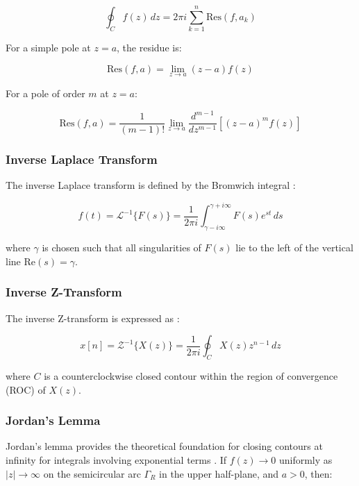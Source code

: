 \documentclass[conference]{IEEEtran}
\begin{document}
\begin{equation}
\oint_C f(z) \, dz = 2\pi i \sum_{k=1}^{n} \text{Res}(f, a_k)
\end{equation}

For a simple pole at $z = a$, the residue is:

\begin{equation}
\text{Res}(f, a) = \lim_{z \to a} (z-a)f(z)
\end{equation}

For a pole of order $m$ at $z = a$:

\begin{equation}
\text{Res}(f, a) = \frac{1}{(m-1)!} \lim_{z \to a} \frac{d^{m-1}}{dz^{m-1}}[(z-a)^m f(z)]
\end{equation}

\subsubsection{Inverse Laplace Transform}

The inverse Laplace transform is defined by the Bromwich integral \cite{doetsch1974}:

\begin{equation}
f(t) = \mathcal{L}^{-1}\{F(s)\} = \frac{1}{2\pi i} \int_{\gamma-i\infty}^{\gamma+i\infty} F(s)e^{st} \, ds
\end{equation}

where $\gamma$ is chosen such that all singularities of $F(s)$ lie to the left of the vertical line $\text{Re}(s) = \gamma$.

\subsubsection{Inverse Z-Transform}

The inverse Z-transform is expressed as \cite{proakis2007}:

\begin{equation}
x[n] = \mathcal{Z}^{-1}\{X(z)\} = \frac{1}{2\pi i} \oint_C X(z)z^{n-1} \, dz
\end{equation}

where $C$ is a counterclockwise closed contour within the region of convergence (ROC) of $X(z)$.

\subsubsection{Jordan's Lemma}

Jordan's lemma provides the theoretical foundation for closing contours at infinity for integrals involving exponential terms \cite{mathews2012}. If $f(z) \to 0$ uniformly as $|z| \to \infty$ on the semicircular arc $\Gamma_R$ in the upper half-plane, and $a > 0$, then:
\end{document}
